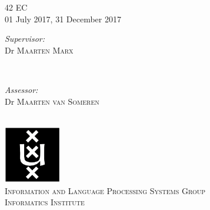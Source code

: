 \begin{titlepage}
42 EC\\ %
01 July 2017, 31 December 2017 \\[1cm]%

\begin{minipage}[t]{0.4\textwidth}
\begin{flushleft} \large
\emph{Supervisor:} \\
Dr \textsc{Maarten Marx} %
\end{flushleft}
\end{minipage}
~
\begin{minipage}[t]{0.4\textwidth}
\begin{flushright} \large
\emph{Assessor:} \\
Dr \textsc{Maarten van Someren}\\
\end{flushright}
\end{minipage}\\[2cm]


\includegraphics[width=2.5cm]{figures/logo-uva}\\ %
\textsc{\large Information and Language Processing Systems Group\\ Informatics Institute}\\[1.0cm] %
 

\vfill %

\end{titlepage}
\restoregeometry

